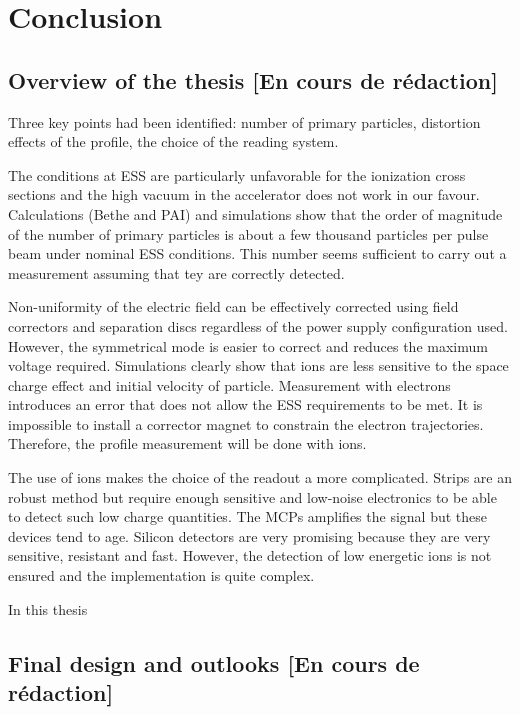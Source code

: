 \chapter{Conclusion}
\cleardoublepage

\minitoc

\section{Overview of the thesis [En cours de rédaction]}
\begin{refsection}


  Three key points had been identified: number of primary particles, distortion effects of the profile, the choice of the reading system. 
  
  The conditions at ESS are particularly unfavorable for the ionization cross sections and the high vacuum in the accelerator does not work in our favour. Calculations (Bethe and PAI) and simulations show that the order of magnitude of the number of primary particles is about a few thousand particles per pulse beam under nominal ESS conditions. This number seems sufficient to carry out a measurement assuming that tey are correctly detected.

  Non-uniformity of the electric field can be effectively corrected using field correctors and separation discs regardless of the power supply configuration used. However, the symmetrical mode is easier to correct and reduces the maximum voltage required.
  Simulations clearly show that ions are less sensitive to the space charge effect and initial velocity of particle. Measurement with electrons introduces an error that does not allow the ESS requirements to be met. It is impossible to install a corrector magnet to constrain the electron trajectories. Therefore, the profile measurement will be done with ions.

  The use of ions makes the choice of the readout a more complicated. Strips are an robust method but require enough sensitive and low-noise electronics to be able to detect such low charge quantities.
  The MCPs amplifies the signal but these devices tend to age. Silicon detectors are very promising because they are very sensitive, resistant and fast. However, the detection of low energetic ions is not ensured and the implementation is quite complex. 

  In this thesis

  \section{Final design and outlooks [En cours de rédaction]}


\end{refsection}
